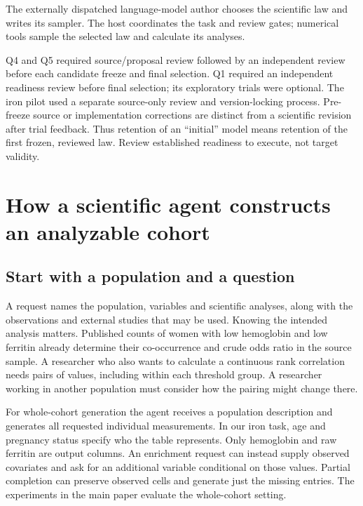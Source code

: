\documentclass[11pt,letterpaper]{article}
\begin{document}
\endgroup

The externally dispatched language-model author chooses the scientific law and writes its sampler. The host coordinates the task and review gates; numerical tools sample the selected law and calculate its analyses.


Q4 and Q5 required source/\allowbreak{}proposal review followed by an independent review before each candidate freeze and final selection. Q1 required an independent readiness review before final selection; its exploratory trials were optional. The iron pilot used a separate source-only review and version-locking process. Pre-freeze source or implementation corrections are distinct from a scientific revision after trial feedback. Thus retention of an “initial” model means retention of the first frozen, reviewed law. Review established readiness to execute, not target validity.


\section{How a scientific agent constructs an analyzable cohort}

\subsection{Start with a population and a question}

A request names the population, variables and scientific analyses, along with the observations and external studies that may be used. Knowing the intended analysis matters. Published counts of women with low hemoglobin and low ferritin already determine their co-occurrence and crude odds ratio in the source sample. A researcher who also wants to calculate a continuous rank correlation needs pairs of values, including within each threshold group. A researcher working in another population must consider how the pairing might change there.


For whole-cohort generation the agent receives a population description and generates all requested individual measurements. In our iron task, age and pregnancy status specify who the table represents. Only hemoglobin and raw ferritin are output columns. An enrichment request can instead supply observed covariates and ask for an additional variable conditional on those values. Partial completion can preserve observed cells and generate just the missing entries. The experiments in the main paper evaluate the whole-cohort setting.
\end{document}
